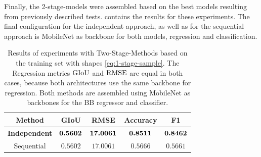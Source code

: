 Finally, the 2-stage-models were assembled based on the best models resulting from previously described tests.
 contains the results for these experiments.
The final configuration for the independent approach, as well as for the sequential approach is MobileNet as backbone for both models, regression and classification.
\begin{table}[!ht]
    \centering
    \begin{tabular}{|c|c|c|c|c|}
    \hline
        \textbf{Method} & \textbf{GIoU} & \textbf{RMSE} & \textbf{Accuracy} & \textbf{F1}  \\
        \hline
        \textbf{Independent} & $\bm{0.5602}$ & $\bm{17.0061}$ & $\bm{0.8511}$ & $\bm{0.8462}$\\
        \hline
        Sequential & $0.5602$ & $17.0061$ & $0.5666$ & $0.5661$\\
        \hline
    \end{tabular}
    \caption{Results of experiments with Two-Stage-Methods based on the training set with shapes \eqref{eq:1-stage-sample}. The Regression metrics $\text{GIoU}$ and $\text{RMSE}$ are equal in both cases, because both architectures use the same backbone for regression. Both methods are assembled using MobileNet as backbones for the BB regressor and classifier.}
    \label{fig:two-stage-results}
\end{table}

